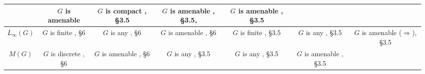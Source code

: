 \documentclass{article}
\theoremstyle{plain}
\theoremstyle{definition}
\begin{document}
\begin{fulltext}
\begin{table}[ht]
\begin{tiny}
\begin{tabular}{|c|c|c|c|c|c|c|}
{				{\cite{RachInjModAndAmenGr}}
            } & 
            \shortstack{
                $G$ is amenable \\
				{\cite{RachInjModAndAmenGr}}
            } & 
            \shortstack{
                $G$ is compact \\
				{\cite{RamsHomPropSemgroupAlg}, \S 3.5}
            } & 
            \shortstack{
                $G$ is amenable \\
				{\cite{RamsHomPropSemgroupAlg}, \S 3.5,}
                {\cite{RachInjModAndAmenGr}}
            } & 
            \shortstack{
                $G$ is amenable \\
				{\cite{RamsHomPropSemgroupAlg}, \S 3.5}
            } \\
        \hline
            $L_\infty(G)$ & 
            \shortstack{
                $G$ is finite \\
				{\cite{DalPolHomolPropGrAlg}, \S 6}
            } & 
            \shortstack{
                $G$ is any \\
				{\cite{DalPolHomolPropGrAlg}, \S 6}
            } & 
            \shortstack{
                $G$ is amenable \\
				{\cite{DalPolHomolPropGrAlg}, \S 6}
            } & 
            \shortstack{
                $G$ is finite \\
				{\cite{RamsHomPropSemgroupAlg}, \S 3.5}
            } & 
            \shortstack{
                $G$ is any \\
				{\cite{RamsHomPropSemgroupAlg}, \S 3.5}
            } & 
            \shortstack{
                $G$ is amenable \\ 
                ($\Longrightarrow$)\cite{RamsHomPropSemgroupAlg}, \S 3.5
            } \\ 
        \hline
            $M(G)$ & 
            \shortstack{
                $G$ is discrete \\
				{\cite{DalPolHomolPropGrAlg}, \S 6}
            } & 
            \shortstack{
                $G$ is amenable \\
				{\cite{DalPolHomolPropGrAlg}, \S 6}
            } & 
            \shortstack{
                $G$ is any \\
				{\cite{RamsHomPropSemgroupAlg}, \S 3.5}
            } & 
            \shortstack{
                $G$ is any \\
				{\cite{RamsHomPropSemgroupAlg}, \S 3.5}
            } & 
            \shortstack{
                $G$ is amenable \\
				{\cite{RamsHomPropSemgroupAlg}, \S 3.5}
}
\end{tabular}
\end{tiny}
\end{table}
\end{fulltext}
\end{document}
